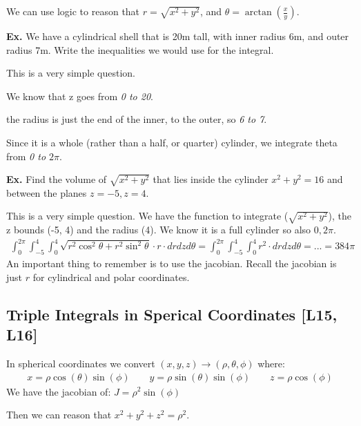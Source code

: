 \documentclass[12pt,letterpaper]{article} \usepackage{amsmath} \usepackage{graphicx} \usepackage[margin=1in]{geometry} \usepackage{longtable}  \usepackage{amssymb}
\begin{document}
	We can use logic to reason that $r =\sqrt{x^2+y^2}$, and $\theta = \arctan\left(\frac{x}{y}\right)$.
	
	\begin{mdframed}[]
	\textbf{Ex.} We have a cylindrical shell that is 20m tall, with inner radius 6m, and outer radius 7m. Write the inequalities we would use for the integral.
	
	This is a very simple question. 
	
	We know that z goes from \textit{0 to 20}. 
	
	the radius is just the end of the inner, to the outer, so \textit{6 to 7}.
	
	Since it is a whole (rather than a half, or quarter) cylinder, we integrate theta from \textit{0 to $2\pi$}.
	\end{mdframed}

	\begin{mdframed}[]
		\textbf{Ex. } Find the volume of $\sqrt{x^2+y^2}$ that lies inside the cylinder $x^2 + y^2 = 16$ and between the planes $z=-5, z=4$.
		
		This is a very simple question. We have the function to integrate ($\sqrt{x^2+y^2}$), the z bounds (-5, 4) and the radius (4). We know it is a full cylinder so also $0, 2\pi$.
		\begin{align*}
			\int_0^{2\pi}\int^4_{-5}\int^4_0 \sqrt{r^2\cos^2\theta + r^2\sin^2\theta} \cdot r\cdot dr dz d\theta = \int_0^{2\pi}\int^4_{-5}\int^4_0 r^2 \cdot dr dz d\theta = ... = 384\pi
		\end{align*}
		An important thing to remember is to use the jacobian. Recall the jacobian is just $r$ for cylindrical and polar coordinates. 
	\end{mdframed}
	
	\subsection{Triple Integrals in Sperical Coordinates [L15, L16]}
	In spherical coordinates we convert $(x,y,z) \to (\rho, \theta, \phi)$ where:
	\begin{align*}
		x = \rho \cos(\theta) \sin(\phi) \qquad y = \rho \sin(\theta) \sin(\phi) \qquad z = \rho \cos(\phi)
	\end{align*}
	We have the jacobian of: $J = \rho^2 \sin(\phi)$
	
	Then we can reason that $x^2 + y^2 + z^2 = \rho ^2$.
	
\end{document}
